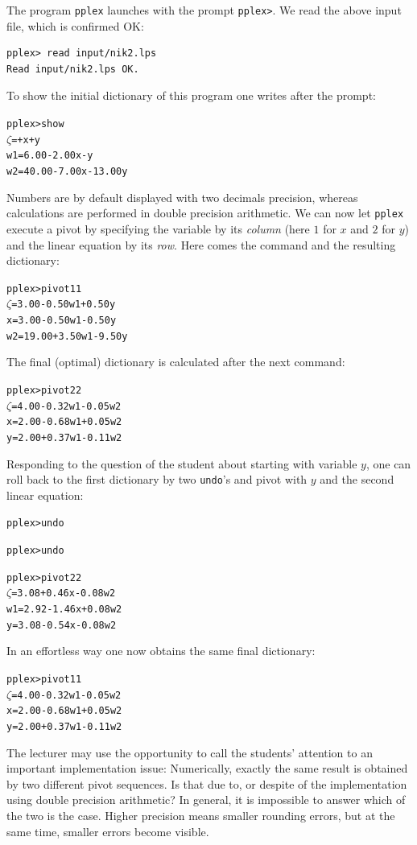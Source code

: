 \documentclass[ukenglish,a4]{article}
\begin{document}
The program \texttt{pplex} launches with the prompt \verb|pplex>|.
We read the above input file, which is confirmed OK:
\begin{verbatim}
pplex> read input/nik2.lps
Read input/nik2.lps OK.
\end{verbatim}
To show the initial dictionary of this program one writes after the prompt:
\begin{alltt}
pplex> show
 \(\zeta\) =       +     x +      y
w1 =  6.00 - 2.00x -      y
w2 = 40.00 - 7.00x - 13.00y
\end{alltt}
Numbers are by default displayed with two decimals precision, whereas
calculations are performed in double precision arithmetic.
We can now let \texttt{pplex} execute a pivot by specifying
the variable by its \emph{column} (here $1$ for $x$ and $2$ for $y$)
and the linear equation by its \emph{row}. 
Here comes the command and the resulting dictionary:
\begin{alltt}
pplex> pivot 1 1
 \(\zeta\) =  3.00 - 0.50w1 + 0.50y
 x =  3.00 - 0.50w1 - 0.50y
w2 = 19.00 + 3.50w1 - 9.50y
\end{alltt}
The final (optimal) dictionary is calculated after the next command:
\begin{alltt}
pplex> pivot 2 2
 \(\zeta\) = 4.00 - 0.32w1 - 0.05w2
 x = 2.00 - 0.68w1 + 0.05w2
 y = 2.00 + 0.37w1 - 0.11w2
\end{alltt}
Responding to the question of the student about starting with variable $y$, 
one can roll back to the first dictionary by two \verb|undo|'s and pivot
with $y$ and the second linear equation:
\begin{alltt}
pplex> undo

pplex> undo

pplex> pivot 2 2
 \(\zeta\) = 3.08 + 0.46x - 0.08w2
w1 = 2.92 - 1.46x + 0.08w2
 y = 3.08 - 0.54x - 0.08w2
\end{alltt}
In an effortless way one now obtains the same final dictionary:
\begin{alltt}
pplex> pivot 1 1 
 \(\zeta\) = 4.00 - 0.32w1 - 0.05w2
 x = 2.00 - 0.68w1 + 0.05w2
 y = 2.00 + 0.37w1 - 0.11w2
\end{alltt}
The lecturer may use the opportunity to call the students' attention to an important implementation issue: Numerically, exactly the same result is obtained by two different pivot sequences. Is that due to, or despite of the implementation using double precision arithmetic?
In general, it is impossible to answer which of the two is the case. Higher precision means smaller rounding errors,
but at the same time, smaller errors become visible. 
\end{document}
